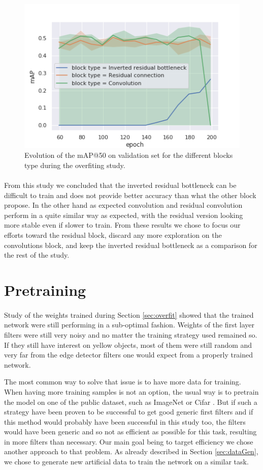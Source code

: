 \begin{figure}
    \centering
    \includegraphics[width=.5\linewidth]{figures/all_epoch_mAP_block_type.png}
    \caption{Evolution of the mAP@50 on validation set for the different blocks type during the overfiting study.}
    \label{fig:overfitmAP}
\end{figure}{}

\paragraph{}
From this study we concluded that the inverted residual bottleneck can be difficult to train and does not provide better accuracy than what the other block propose. In the other hand as expected convolution and residual convolution perform in a quite similar way as expected, with the residual version looking more stable even if slower to train. From these results we chose to focus our efforts toward the residual block, discard any more exploration on the convolutions block, and keep the inverted residual bottleneck as a comparison for the rest of the study.

\section{Pretraining}
\paragraph{}
Study of the weights trained during Section \ref{sec:overfit} showed that the trained network were still performing in a sub-optimal fashion. Weights of the first layer filters were still very noisy and no matter the training strategy used remained so. If they still have interest on yellow objects, most of them were still random and very far from the edge detector filters one would expect from a properly trained network.

The most common way to solve that issue is to have more data for training. When having more training samples is not an option, the usual way is to pretrain the model on one of the public dataset, such as ImageNet \cite{deng2009imagenet} or Cifar \cite{krizhevsky2009cifar10}. But if such a strategy have been proven to be successful to get good generic first filters and if this method would probably have been successful in this study too, the filters would have been generic and so not as efficient as possible for this task, resulting in more filters than necessary. Our main goal being to target efficiency we chose another approach to that problem. As already described in Section \ref{sec:dataGen}, we chose to generate new artificial data to train the network on a similar task.

